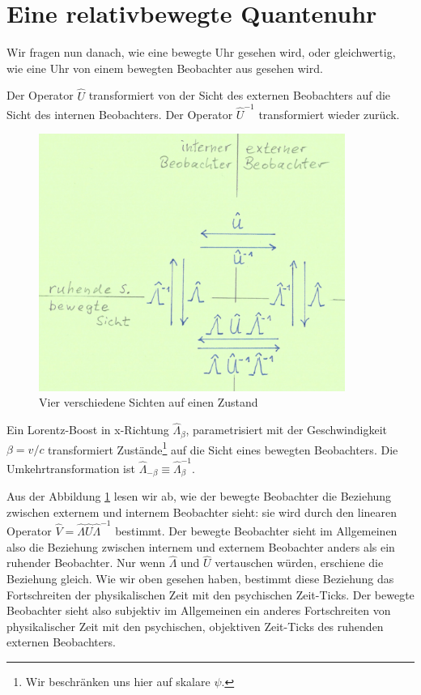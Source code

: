 \documentclass[12pt]{article}
\begin{document}
\section{Eine relativbewegte Quantenuhr}

Wir fragen nun danach, wie eine bewegte Uhr gesehen wird, oder gleichwertig, wie eine Uhr von einem bewegten Beobachter aus gesehen wird. 

Der Operator $\hat{U}$ transformiert von der Sicht des externen Beobachters auf die Sicht des internen Beobachters. Der Operator $\hat{U}^{-1}$ transformiert wieder zurück.

\begin{figure}[!h]\begin{center}
  \includegraphics[width=10cm]{Bewegte_Uhr.png}
  \caption{Vier verschiedene Sichten auf einen Zustand}
  \label{fig:moved_clock}
\end{center}\end{figure}

Ein Lorentz-Boost in x-Richtung $\hat{\Lambda}_\beta$, parametrisiert mit der Geschwindigkeit $\beta=v/c$ transformiert Zustände\footnote{Wir beschränken uns hier auf skalare $\psi$.} auf die Sicht eines bewegten Beobachters. Die Umkehrtransformation ist $\hat{\Lambda}_{-\beta} \equiv \hat{\Lambda}_{\beta}^{-1}$.

Aus der Abbildung \ref{fig:moved_clock} lesen wir ab, wie der bewegte Beobachter die Beziehung zwischen externem und internem Beobachter sieht: sie wird durch den linearen Operator $\hat{V} = \hat{\Lambda} \hat{U} \hat{\Lambda}^{-1}$ bestimmt. Der bewegte Beobachter sieht im Allgemeinen also die Beziehung zwischen internem und externem Beobachter anders als ein ruhender Beobachter. Nur wenn $\hat{\Lambda}$ und $\hat{U}$ vertauschen würden, erschiene die Beziehung gleich. Wie wir oben gesehen haben, bestimmt diese Beziehung das Fortschreiten der physikalischen Zeit mit den psychischen Zeit-Ticks. Der bewegte Beobachter sieht also subjektiv im Allgemeinen ein anderes Fortschreiten von physikalischer Zeit mit den psychischen, objektiven Zeit-Ticks des ruhenden externen Beobachters.
\end{document}
